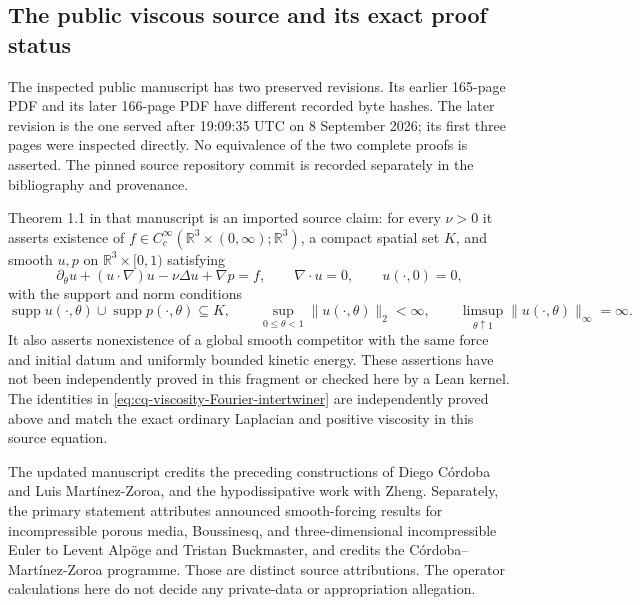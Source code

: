\subsection{The public viscous source and its exact proof status}
\label{sec:cq-public-NS-source}

The inspected public manuscript \cite{cqNS2026} has two preserved
revisions. Its earlier 165-page PDF and its later 166-page PDF
have different recorded byte hashes. The later revision is the
one served after 19:09:35 UTC on 8 September 2026; its first
three pages were inspected directly. No equivalence of the
two complete proofs is asserted. The pinned source repository
commit is recorded separately in the bibliography and provenance.

Theorem 1.1 in that manuscript is an imported source claim:
for every $\nu>0$ it asserts existence of
$f\in C_c^\infty(\mathbb R^3\times(0,\infty);\mathbb R^3)$,
a compact spatial set $K$, and smooth $u,p$ on
$\mathbb R^3\times[0,1)$ satisfying
\[
 \partial_\theta u+(u\cdot\nabla)u-\nu\Delta u+\nabla p=f,
 \qquad \nabla\cdot u=0,\qquad u(\cdot,0)=0,
\]
with the support and norm conditions
\[
 \operatorname{supp}u(\cdot,\theta)\cup
 \operatorname{supp}p(\cdot,\theta)\subseteq K,\qquad
 \sup_{0\leq\theta<1}\|u(\cdot,\theta)\|_2<\infty,\qquad
 \limsup_{\theta\uparrow1}\|u(\cdot,\theta)\|_\infty=\infty .
\]
It also asserts nonexistence of a global smooth competitor
with the same force and initial datum and uniformly bounded
kinetic energy. These assertions have not been independently
proved in this fragment or checked here by a Lean kernel.
The identities in \eqref{eq:cq-viscosity-Fourier-intertwiner}
are independently proved above and match the exact ordinary
Laplacian and positive viscosity in this source equation.

The updated manuscript credits the preceding constructions
of Diego C\'ordoba and Luis Mart\'inez-Zoroa, and the
hypodissipative work with Zheng. Separately, the primary
statement \cite{cqABStatement} attributes announced
smooth-forcing results for incompressible porous media,
Boussinesq, and three-dimensional incompressible Euler to
Levent Alp\"oge and Tristan Buckmaster, and credits the
C\'ordoba--Mart\'inez-Zoroa programme. Those are distinct
source attributions. The operator calculations here do not
decide any private-data or appropriation allegation.
